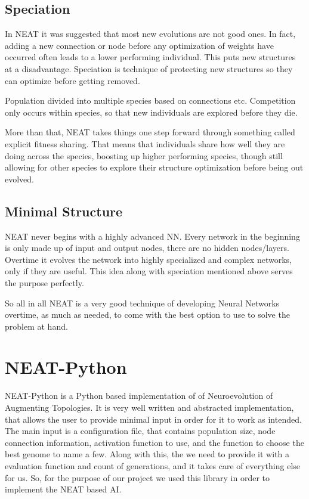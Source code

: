 \documentclass[conference]{IEEEtran}
\begin{document}
\subsection{Speciation}

In NEAT it was suggested that most new evolutions are not good ones. In fact, adding a new connection or node before any optimization of weights have occurred often leads to a lower performing individual. This puts new structures at a disadvantage. Speciation is technique of protecting new structures so they can optimize before getting removed.

Population divided into multiple species based on connections etc. Competition only occurs within species, so that new individuals are explored before they die.

More than that, NEAT takes things one step forward through something called explicit fitness sharing. That means that individuals share how well they are doing across the species, boosting up higher performing species, though still allowing for other species to explore their structure optimization before being out evolved. \cite{b2}

\subsection{Minimal Structure}

NEAT never begins with a highly advanced NN. Every network in the beginning is only made up of input and output nodes, there are no hidden nodes/layers. Overtime it evolves the network into highly specialized and complex networks, only if they are useful. This idea along with speciation mentioned above serves the purpose perfectly. \cite{b2}

So all in all NEAT is a very good technique of developing Neural Networks overtime, as much as needed, to come with the best option to use to solve the problem at hand.

\section{NEAT-Python}

NEAT-Python is a Python based implementation of of Neuroevolution of Augmenting Topologies. It is very well written and abstracted implementation, that allows the user to provide minimal input in order for it to work as intended. The main input is a configuration file, that contains population size, node connection information, activation function to use, and the function to choose the best genome to name a few. Along with this, the we need to provide it with a evaluation function and count of generations, and it takes care of everything else for us. So, for the purpose of our project we used this library in order to implement the NEAT based AI. \cite{b3}
\end{document}
